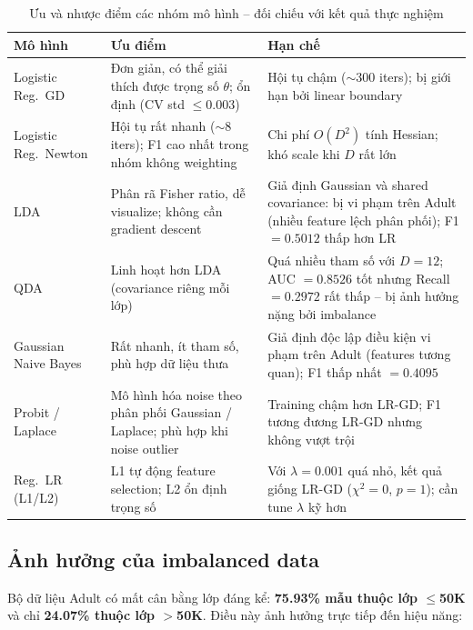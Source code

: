\documentclass[12pt, a4paper]{article}
\begin{document}
\begin{table}[H]
  \centering
  \caption{Ưu và nhược điểm các nhóm mô hình -- đối chiếu với kết quả thực nghiệm}
  \label{tab:strengths}
  \begin{tabular}{p{2.8cm}p{5.2cm}p{5.2cm}}
    \toprule
    \textbf{Mô hình} & \textbf{Ưu điểm} & \textbf{Hạn chế} \\
    \midrule
    Logistic Reg.\ GD
      & Đơn giản, có thể giải thích được trọng số $\theta$; ổn định (CV std $\leq 0.003$)
      & Hội tụ chậm ($\sim$300 iters); bị giới hạn bởi linear boundary \\
    \addlinespace
    Logistic Reg.\ Newton
      & Hội tụ rất nhanh ($\sim$8 iters); F1 cao nhất trong nhóm không weighting
      & Chi phí $O(D^2)$ tính Hessian; khó scale khi $D$ rất lớn \\
    \addlinespace
    LDA
      & Phân rã Fisher ratio, dễ visualize; không cần gradient descent
      & Giả định Gaussian và shared covariance: bị vi phạm trên Adult (nhiều feature lệch phân phối); F1 $= 0.5012$ thấp hơn LR \\
    \addlinespace
    QDA
      & Linh hoạt hơn LDA (covariance riêng mỗi lớp)
      & Quá nhiều tham số với $D=12$; AUC $= 0.8526$ tốt nhưng Recall $= 0.2972$ rất thấp -- bị ảnh hưởng nặng bởi imbalance \\
    \addlinespace
    Gaussian Naive Bayes
      & Rất nhanh, ít tham số, phù hợp dữ liệu thưa
      & Giả định độc lập điều kiện vi phạm trên Adult (features tương quan); F1 thấp nhất $= 0.4095$ \\
    \addlinespace
    Probit / Laplace
      & Mô hình hóa noise theo phân phối Gaussian / Laplace; phù hợp khi noise outlier
      & Training chậm hơn LR-GD; F1 tương đương LR-GD nhưng không vượt trội \\
    \addlinespace
    Reg.\ LR (L1/L2)
      & L1 tự động feature selection; L2 ổn định trọng số
      & Với $\lambda = 0.001$ quá nhỏ, kết quả giống LR-GD ($\chi^2=0$, $p=1$); cần tune $\lambda$ kỹ hơn \\
    \bottomrule
  \end{tabular}
\end{table}

\subsection{Ảnh hưởng của imbalanced data}

Bộ dữ liệu Adult có mất cân bằng lớp đáng kể: \textbf{75.93\% mẫu thuộc lớp $\leq$50K}
và chỉ \textbf{24.07\% thuộc lớp $>$50K}. Điều này ảnh hưởng trực tiếp đến hiệu năng:
\end{document}
